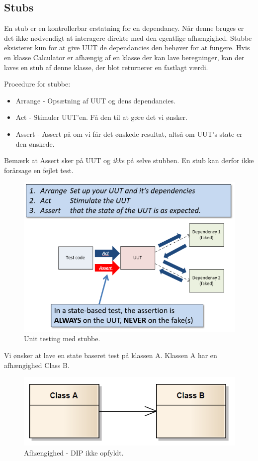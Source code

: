 \subsection{Stubs}
En stub er en kontrollerbar erstatning for en dependancy. Når denne bruges er det ikke nødvendigt at interagere direkte med den egentlige afhængighed.
Stubbe eksisterer kun for at give UUT de dependancies den behøver for at fungere.
Hvis en klasse Calculator er afhængig af en klasse der kan lave beregninger, kan der laves en stub af denne klasse, der blot returnerer en fastlagt værdi. 

Procedure for stubbe:
\begin{itemize}
	\item Arrange - Opsætning af UUT og dens dependancies.
	\item Act - Stimuler UUT'en. Få den til at gøre det vi ønsker.
	\item Assert - Assert på om vi får det ønskede resultat, altså om UUT's state er den ønskede.
\end{itemize}

Bemærk at Assert sker på UUT og \textit{ikke} på selve stubben. En stub kan derfor ikke forårsage en fejlet test.

\begin{figure}
	\centering
	\includegraphics[width=0.7\linewidth]{figs/stubTest.PNG}
	\caption{Unit testing med stubbe.}
	\label{fig:stubTest}
\end{figure}

Vi ønsker at lave en state baseret test på klassen A. Klassen A har en afhængighed Class B.

\begin{figure}[H]
	\centering
	\includegraphics[width=0.7\linewidth]{figs/stubNoInterface.PNG}
	\caption{Afhængighed - DIP ikke opfyldt.}
	\label{fig:stubNoInterface}
\end{figure}

